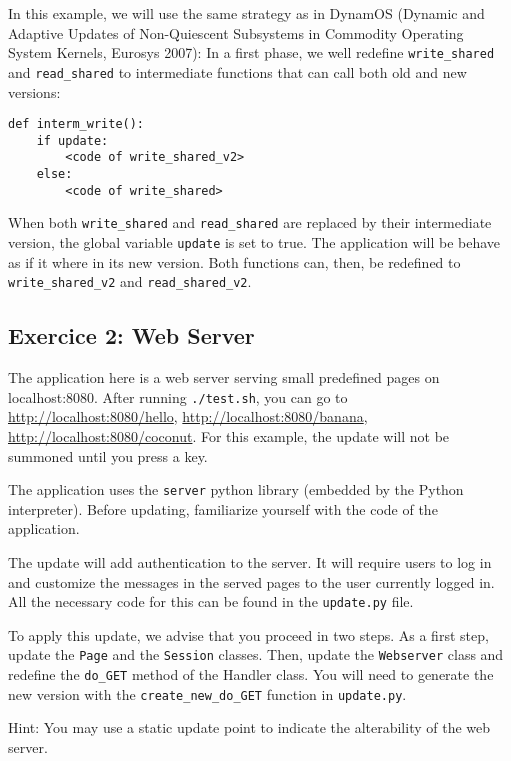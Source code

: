 \documentclass{article}
\begin{document}
In this example, we will use the same strategy as in DynamOS (Dynamic
and Adaptive Updates of Non-Quiescent Subsystems in Commodity
Operating System Kernels, Eurosys 2007): In a first phase, we well
redefine \texttt{write\_shared} and \texttt{read\_shared} to
intermediate functions that can call both old and new versions:

\begin{verbatim}
def interm_write():
    if update:
        <code of write_shared_v2>
    else:
        <code of write_shared>
\end{verbatim}
 
When both \texttt{write\_shared} and \texttt{read\_shared} are
replaced by their intermediate version, the global variable
\texttt{update} is set to true. The application will be behave as if
it where in its new version. Both functions can, then, be redefined to
\texttt{write\_shared\_v2} and \texttt{read\_shared\_v2}.


\subsection{Exercice 2: Web Server}

The application here is a web server serving small predefined pages on
localhost:8080. After running \texttt{./test.sh}, you can go to
\url{http://localhost:8080/hello}, \url{http://localhost:8080/banana},
\url{http://localhost:8080/coconut}. For this example, the update will
not be summoned until you press a key.

The application uses the \texttt{server} python library (embedded by
the Python interpreter). Before updating, familiarize yourself with
the code of the application.

The update will add authentication to the server. It will require
users to log in and customize the messages in the served pages to the
user currently logged in. All the necessary code for this can be found
in the \texttt{update.py} file.

To apply this update, we advise that you proceed in two steps. As a
first step, update the \texttt{Page} and the \texttt{Session}
classes. Then, update the \texttt{Webserver} class and redefine the
\texttt{do\_GET} method of the Handler class. You will need to generate
the new version with the \texttt{create\_new\_do\_GET} function in
\texttt{update.py}.

Hint: You may use a static update point to indicate the alterability
of the web server.
\end{document}
